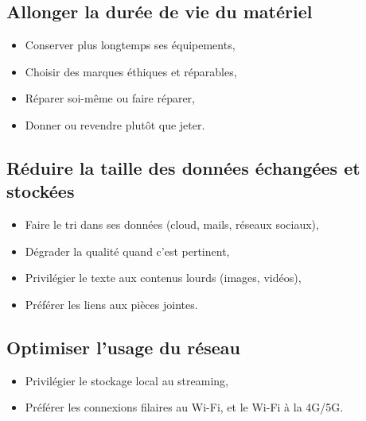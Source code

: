 \documentclass[11pt, a4paper]{book}
\begin{document}
\subsection{Allonger la durée de vie du matériel}
\begin{itemize}
  \item Conserver plus longtemps ses équipements,
  \item Choisir des marques éthiques et réparables,
  \item Réparer soi-même ou faire réparer,
  \item Donner ou revendre plutôt que jeter.
\end{itemize}

\subsection{Réduire la taille des données échangées et stockées}
\begin{itemize}
  \item Faire le tri dans ses données (cloud, mails, réseaux sociaux),
  \item Dégrader la qualité quand c’est pertinent,
  \item Privilégier le texte aux contenus lourds (images, vidéos),
  \item Préférer les liens aux pièces jointes.
\end{itemize}

\subsection{Optimiser l’usage du réseau}
\begin{itemize}
  \item Privilégier le stockage local au streaming,
  \item Préférer les connexions filaires au Wi-Fi, et le Wi-Fi à la 4G/5G.
\end{itemize}
\end{document}
